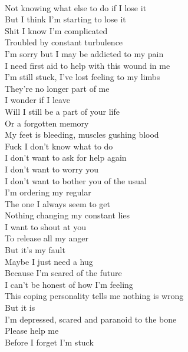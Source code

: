 \documentclass[12pt, b5paper, oneside]{book}
\begin{document}
\\Not knowing what else to do if I lose it
\\But I think I'm starting to lose it
\\Shit I know I'm complicated
\\Troubled by constant turbulence
\\I'm sorry but I may be addicted to my pain
\\I need first aid to help with this wound in me
\\I'm still stuck, I've lost feeling to my limbs
\\They're no longer part of me
\\I wonder if I leave
\\Will I still be a part of your life
\\Or a forgotten memory
\\My feet is bleeding, muscles gushing blood
\\Fuck I don't know what to do
\\I don't want to ask for help again
\\I don't want to worry you
\\I don't want to bother you of the usual
\\I'm ordering my regular
\\The one I always seem to get
\\Nothing changing my constant lies
\\I want to shout at you
\\To release all my anger
\\But it's my fault
\\Maybe I just need a hug
\\Because I'm scared of the future
\\I can't be honest of how I'm feeling
\\This coping personality tells me nothing is wrong
\\But it is
\\I'm depressed, scared and paranoid to the bone
\\Please help me
\\Before I forget I'm stuck
\newpage
\end{document}
